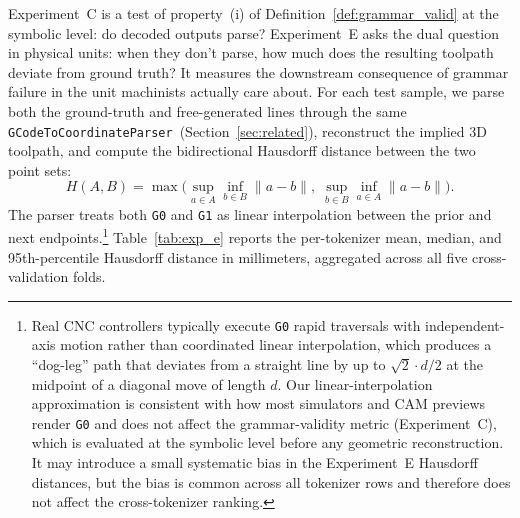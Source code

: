 \documentclass[11pt]{article}
\begin{document}
Experiment~C is a test of property~(i) of Definition~\ref{def:grammar_valid} at the symbolic level: do decoded outputs parse? Experiment~E asks the dual question in physical units: when they don't parse, how much does the resulting toolpath deviate from ground truth? It measures the downstream consequence of grammar failure in the unit machinists actually care about. For each test sample, we parse both the ground-truth and free-generated lines through the same \texttt{GCodeToCoordinateParser}~(Section~\ref{sec:related}), reconstruct the implied 3D toolpath, and compute the bidirectional Hausdorff distance between the two point sets:
\[
H(A, B) = \max\!\Big(\sup_{a \in A}\inf_{b \in B}\|a-b\|,\;\sup_{b \in B}\inf_{a \in A}\|a-b\|\Big).
\]
The parser treats both \texttt{G0} and \texttt{G1} as linear interpolation between the prior and next endpoints.\footnote{Real CNC controllers typically execute \texttt{G0} rapid traversals with independent-axis motion rather than coordinated linear interpolation, which produces a ``dog-leg'' path that deviates from a straight line by up to $\sqrt{2}\cdot d/2$ at the midpoint of a diagonal move of length $d$. Our linear-interpolation approximation is consistent with how most simulators and CAM previews render \texttt{G0} and does not affect the grammar-validity metric (Experiment~C), which is evaluated at the symbolic level before any geometric reconstruction. It may introduce a small systematic bias in the Experiment~E Hausdorff distances, but the bias is common across all tokenizer rows and therefore does not affect the cross-tokenizer ranking.}
Table~\ref{tab:exp_e} reports the per-tokenizer mean, median, and 95th-percentile Hausdorff distance in millimeters, aggregated across all five cross-validation folds.
\end{document}
